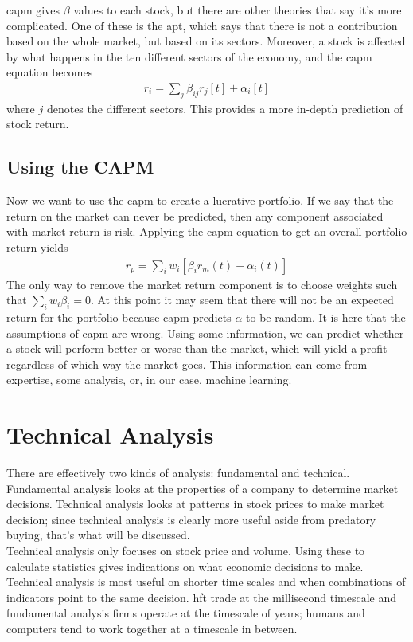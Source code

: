 \ac{capm} gives $\beta$ values to each stock, but there are other theories that say it's more complicated. One of these is the \ac{apt}, which says that there is not a contribution based on the whole market, but based on its sectors. Moreover, a stock is affected by what happens in the ten different sectors of the economy, and the \ac{capm} equation becomes
\begin{align*}
r_i=\sum_j\beta_{ij} r_j[t]+\alpha_i[t]
\end{align*}
where $j$ denotes the different sectors. This provides a more in-depth prediction of stock return.
\subsection{Using the CAPM}
Now we want to use the \ac{capm} to create a lucrative portfolio. If we say that the return on the market can never be predicted, then any component associated with market return is risk. Applying the \ac{capm} equation to get an overall portfolio return yields
\begin{align*}
r_p=\sum_iw_i[\beta_i r_m(t)+\alpha_i(t)]
\end{align*}
The only way to remove the market return component is to choose weights such that $\sum_iw_i\beta_i=0$. At this point it may seem that there will not be an expected return for the portfolio because \ac{capm} predicts $\alpha$ to be random. It is here that the assumptions of \ac{capm} are wrong. Using some information, we can predict whether a stock will perform better or worse than the market, which will yield a profit regardless of which way the market goes. This information can come from expertise, some analysis, or, in our case, machine learning.

\section{Technical Analysis}
There are effectively two kinds of analysis: fundamental and technical. Fundamental analysis looks at the properties of a company to determine market decisions. Technical analysis looks at patterns in stock prices to make market decision; since technical analysis is clearly more useful aside from predatory buying, that's what will be discussed. \\

Technical analysis only focuses on stock price and volume. Using these to calculate statistics gives indications on what economic decisions to make. Technical analysis is most useful on shorter time scales and when combinations of indicators point to the same decision. \ac{hft} trade at the millisecond timescale and fundamental analysis firms operate at the timescale of years; humans and computers tend to work together at a timescale in between. 
\newpage

